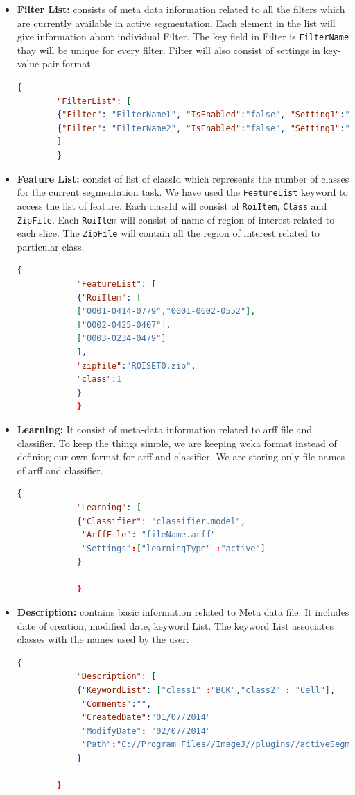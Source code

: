 \documentclass[a4paper,10pt]{article}
\begin{document}
	\begin{itemize}
		\item \textbf{Filter List: } consists of meta data information related to all the filters which are currently available in active segmentation. Each element in the list will give information about individual Filter. The key field in Filter is \texttt{FilterName} thay will be unique for every filter. Filter will also consist of settings in key- value pair format.
		\begin{lstlisting}[language=json,firstnumber=1]
		{
		"FilterList": [
		{"Filter": "FilterName1", "IsEnabled":"false", "Setting1":"true","Setting2":"2","Setting3":"false"},
		{"Filter": "FilterName2", "IsEnabled":"false", "Setting1":"true","Setting2":"2","Setting3":"false"}
		]
		}
		\end{lstlisting}
		
		\item \textbf{Feature List: } consist of list of classId which represents the number of classes for the current segmentation task. We have used the \texttt{FeatureList} keyword to access the list of feature. Each classId will consist of \texttt{RoiItem}, \texttt{Class} and \texttt{ZipFile}. Each \texttt{RoiItem} will consist of name of region of interest related to each slice. The \texttt{ZipFile} will contain all the region of interest related to particular class. 
		
			\begin{lstlisting}[language=json,firstnumber=1]
			{
			"FeatureList": [
			{"RoiItem": [
			["0001-0414-0779","0001-0602-0552"],
			["0002-0425-0407"],
			["0003-0234-0479"]
			],
			"zipfile":"ROISET0.zip",
			"class":1
			}
			}
			\end{lstlisting}
		\item \textbf{Learning: } It consist of meta-data information related to arff file and classifier. To keep the things simple, we are keeping weka format instead of defining our own format for arff and classifier. We are storing only file names of arff and classifier.
			\begin{lstlisting}[language=json,firstnumber=1]
			{
			"Learning": [
			{"Classifier": "classifier.model",
			 "ArffFile": "fileName.arff"
			 "Settings":["learningType" :"active"]
			}
			
			}
			\end{lstlisting}
		
		
		\item \textbf{Description: } contains basic information related to Meta data file. It includes date of creation,  modified date, keyword List. The keyword List associates classes with the names used by the user.
		\begin{lstlisting}[language=json,firstnumber=1]
		{
			"Description": [
			{"KeywordList": ["class1" :"BCK","class2" : "Cell"],
			 "Comments":"",
			 "CreatedDate":"01/07/2014"
		   	 "ModifyDate": "02/07/2014"
		   	 "Path":"C://Program Files//ImageJ//plugins//activeSegmentation//"
	    	}
				
		}
		\end{lstlisting}
	
			
	\end{itemize}
	
	
	
	
\end{document}
